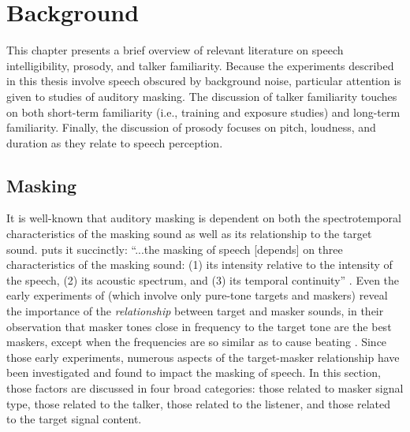 \chapter{Background}
This chapter presents a brief overview of relevant literature on speech intelligibility, prosody, and talker familiarity.  Because the experiments described in this thesis involve speech obscured by background noise, particular attention is given to studies of auditory masking.  The discussion of talker familiarity touches on both short-term familiarity (i.e., training and exposure studies) and long-term familiarity.  Finally, the discussion of prosody focuses on pitch, loudness, and duration as they relate to speech perception.

\section{Masking}
It is well-known that auditory masking is dependent on both the spectrotemporal characteristics of the masking sound as well as its relationship to the target sound.  \citet{Miller1947} puts it succinctly: “...the masking of speech [depends] on three characteristics of the masking sound: (1) its intensity relative to the intensity of the speech, (2) its acoustic spectrum, and (3) its temporal continuity” \citep[106]{Miller1947}.  Even the early experiments of \citeauthor{WegelLane1924} (which involve only pure-tone targets and maskers) reveal the importance of the \emph{relationship} between target and masker sounds, in their observation that masker tones close in frequency to the target tone are the best maskers, except when the frequencies are so similar as to cause beating \citep{WegelLane1924}.  
Since those early experiments, numerous aspects of the target-masker relationship have been investigated and found to impact the masking of speech.  In this section, those factors are discussed in four broad categories: those related to masker signal type, those related to the talker, those related to the listener, and those related to the target signal content.

